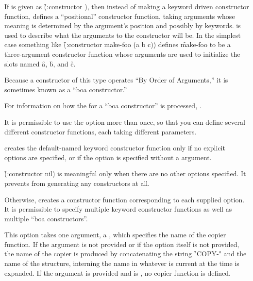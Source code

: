 If  is given as
\f{(:constructor  )}, 
then instead of making a keyword
driven constructor function,  
defines a ``positional'' constructor function,
taking arguments whose meaning is determined by the argument's position
and possibly by keywords.
 is used to describe what the arguments to the
constructor will be. In the simplest case something like
\f{(:constructor make-foo (a b c))} defines \f{make-foo} to be
a three-argument 
constructor function whose arguments are used to initialize the
slots named \f{a}, \f{b}, and \f{c}.

Because a constructor of this type operates ``By Order of Arguments,''
it is sometimes known as a ``boa constructor.''

For information on how the  for a ``boa constructor'' is
processed, \seesection\BoaLambdaLists.

It is permissible to use the
 option more than once, so that you can define several
different constructor functions, each taking different parameters.



 creates the default-named keyword constructor function
only if no explicit  options are specified, or if the
 option is specified without a  argument.

\f{(:constructor nil)} is meaningful only when there are no other
 options specified.  It prevents 
from generating any constructors at all.

Otherwise,  creates a constructor function corresponding
to each supplied  option.  It is permissible to specify
multiple keyword constructor functions as well as multiple 
``boa constructors''.



This option takes one argument, a ,
which specifies the name of the copier
function.  If the argument is not provided or if the option itself is not
provided, the name of the copier is produced by concatenating the
string \f{"COPY-"} and the name of the structure, interning the name
in whatever  is current at the time 
is expanded.
If the argument is provided and is \nil, no copier function is defined.

